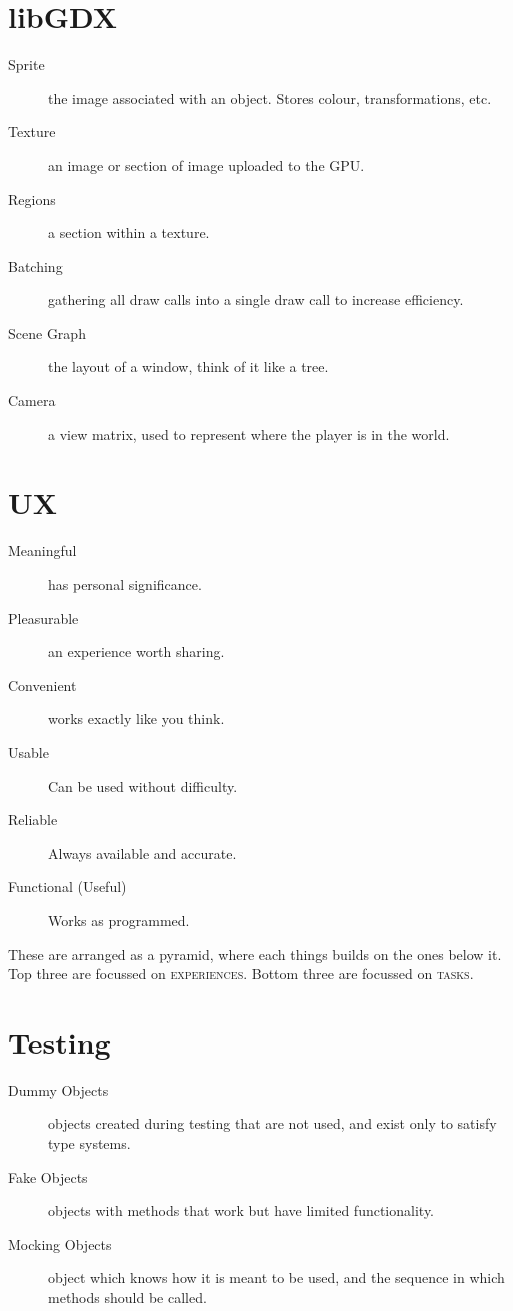 \documentclass[landscape]{cheat}
\begin{document}
\begin{multicols*}{3}
\section{libGDX}
\begin{description}
    \item[Sprite] the image associated with an object.
        Stores colour, transformations, etc.
    \item[Texture] an image or section of image uploaded to the GPU.
    \item[Regions] a section within a texture.
    \item[Batching] gathering all draw calls into a single draw call to increase efficiency.
    \item[Scene Graph] the layout of a window, think of it like a tree.
    \item[Camera] a view matrix, used to represent where the player is in the world.
\end{description}

\section{UX}
\begin{description}
    \item[Meaningful] has personal significance.
    \item[Pleasurable] an experience worth sharing.
    \item[Convenient] works exactly like you think.
    \item[Usable] Can be used without difficulty.
    \item[Reliable] Always available and accurate.
    \item[Functional (Useful)] Works as programmed.
\end{description}
These are arranged as a pyramid, where each things builds on the ones below it.
Top three are focussed on \textsc{experiences}.
Bottom three are focussed on \textsc{tasks}.

\section{Testing}
\begin{description}
    \item[Dummy Objects] objects created during testing that are not used, and exist only to satisfy type systems.
    \item[Fake Objects] objects with methods that work but have limited functionality.
    \item[Mocking Objects] object which knows how it is meant to be used, and the sequence in which methods should be called.
\end{description}

\end{multicols*}
\end{document}
